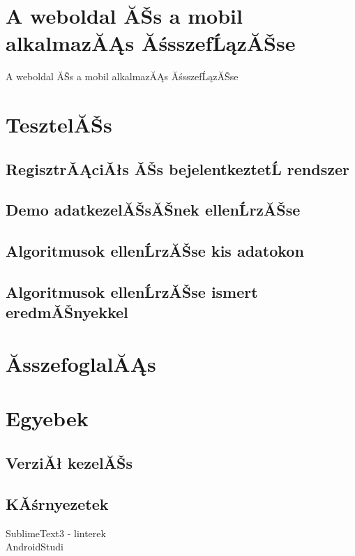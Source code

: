 \documentclass[12pt]{report}
\newtheorem{tĂŠt}{TĂŠtel}[chapter]
\theoremstyle{definition}
\begin{document}
\chapter{A weboldal ĂŠs a mobil alkalmazĂĄs ĂśsszefĹązĂŠse}
A weboldal ĂŠs a mobil alkalmazĂĄs ĂśsszefĹązĂŠse

\chapter{TesztelĂŠs}
\section{RegisztrĂĄciĂłs ĂŠs bejelentkeztetĹ rendszer}
\section{Demo adatkezelĂŠsĂŠnek ellenĹrzĂŠse}
\section{Algoritmusok ellenĹrzĂŠse kis adatokon}
\section{Algoritmusok ellenĹrzĂŠse ismert eredmĂŠnyekkel}

\chapter{ĂsszefoglalĂĄs}

\chapter{Egyebek}
\section{VerziĂł kezelĂŠs}

\section{KĂśrnyezetek}
SublimeText3 - linterek\\

AndroidStudi

\end{document}
